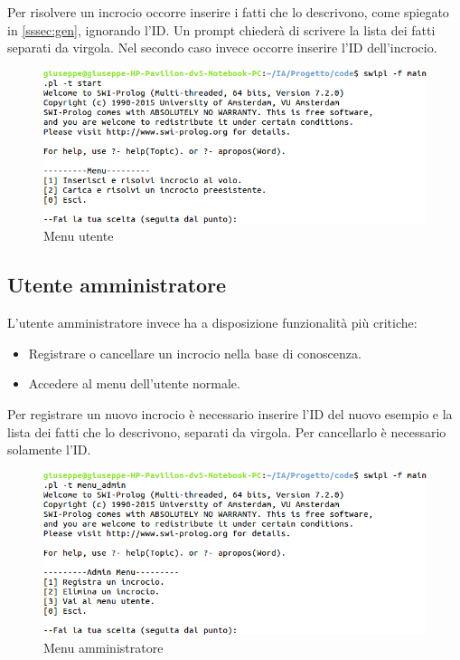 Per risolvere un incrocio occorre inserire i fatti che lo descrivono, come spiegato in \ref{sssec:gen}, ignorando l'ID. Un prompt chiederà di scrivere la lista dei fatti separati da virgola. Nel secondo caso invece occorre inserire l'ID dell'incrocio.

\begin{figure}[!hbtp]
	\includegraphics[width=\textwidth]{images/shell/user}
	\caption{Menu utente}
\end{figure}


\subsection{Utente amministratore}
L'utente amministratore invece ha a disposizione funzionalità più critiche:
\begin{itemize}
	\item Registrare o cancellare un incrocio nella base di conoscenza.
	\item Accedere al menu dell'utente normale.
\end{itemize}

Per registrare un nuovo incrocio è necessario inserire l'ID del nuovo esempio e la lista dei fatti che lo descrivono, separati da virgola. Per cancellarlo è necessario solamente l'ID.

\begin{figure}[!hbtp]
	\includegraphics[width=\textwidth]{images/shell/admin}
	\caption{Menu amministratore}
\end{figure}

